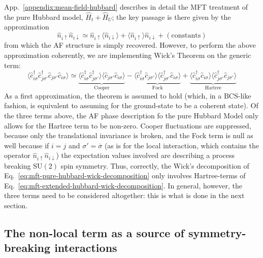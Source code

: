 App.~\ref{appendix:mean-field-hubbard} describes in detail the MFT treatment of the pure Hubbard model, $\hat H_t + \hat H_U$; the key passage is there given by the approximation
\begin{equation}\label{eq:mft-pure-hubbard-wick-decomposition}
	\hat n_{i\uparrow} \hat n_{i\downarrow} \simeq \hat n_{i\uparrow} \langle \hat n_{i\downarrow} \rangle + \langle \hat n_{i\uparrow} \rangle \hat n_{i\downarrow} + (\mathrm{constants})
\end{equation}
from which the AF structure is simply recovered. However, to perform the above approximation coherently, we are implementing Wick's Theorem on the generic term:
\begin{equation}\label{eq:mft-extended-hubbard-wick-decomposition}
	\langle
		\hat c_{i\sigma}^\dagger \hat c_{j\sigma'}^\dagger \hat c_{j\sigma'} \hat c_{i\sigma}
	\rangle \simeq \underbrace{
		\langle 
			\hat c_{i\sigma}^\dagger \hat c_{j\sigma'}^\dagger
		\rangle \langle	
			\hat c_{j\sigma'} \hat c_{i\sigma} 
		\rangle 
	}_{\text{Cooper}}
	- 
	\underbrace{
		\langle 
			\hat c_{i\sigma}^\dagger \hat c_{j\sigma'}
		\rangle \langle	
			\hat c_{j\sigma'}^\dagger \hat c_{i\sigma} 
		\rangle 
	}_{\text{Fock}}
	+ 
	\underbrace{
		\langle 
		\hat c_{i\sigma}^\dagger \hat c_{i\sigma}
		\rangle \langle	
		\hat c_{j\sigma'}^\dagger \hat c_{j\sigma'} 
		\rangle
	}_{\text{Hartree}}
\end{equation}
As a first approximation, the theorem is assumed to hold (which, in a $\mathrm{BCS}$-like fashion, is equivalent to assuming for the ground-state to be a coherent state). Of the three terms above, the AF phase description fo the pure Hubbard Model only allows for the Hartree term to be non-zero. Cooper fluctuations are suppressed, because only the translational invariance is broken, and the Fock term is null as well because if $i=j$ and $\sigma'=\overline{\sigma}$ (as is for the local interaction, which contains the operator $\hat n_{i\uparrow} \hat n_{i\downarrow}$) the expectation values involved are describing a process breaking $\mathrm{SU}(2)$ spin symmetry. Thus, correctly, the Wick's decomposition of Eq.~\eqref{eq:mft-pure-hubbard-wick-decomposition} only involves Hartree-terms of Eq.~\eqref{eq:mft-extended-hubbard-wick-decomposition}. In general, however, the three terms need to be considered altogether: this is what is done in the next section.

\subsection{The non-local term as a source of symmetry-breaking interactions}

